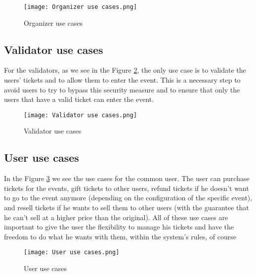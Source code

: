 \begin{figure}[H]
    \texttt{[image: Organizer use cases.png]}
    \centering
    \caption{Organizer use cases}
    \label{fig:organizer_use_cases}
\end{figure}

\subsection{Validator use cases}
\label{subsec:validator_use_cases}

For the validators, as we see in the Figure \ref{fig:validator_use_cases}, the only use case is to validate the users' tickets and to allow them to enter the event. This is a necessary step to avoid users to try to bypass this security measure and to ensure that only the users that have a valid ticket can enter the event.

\begin{figure}[H]
    \texttt{[image: Validator use cases.png]}
    \centering
    \caption{Validator use cases}
    \label{fig:validator_use_cases}
\end{figure}

\subsection{User use cases}
\label{subsec:user_use_cases}

In the Figure \ref{fig:user_use_cases} we see the use cases for the common user. The user can purchase tickets for the events, gift tickets to other users, refund tickets if he doesn't want to go to the event anymore (depending on the configuration of the specific event), and resell tickets if he wants to sell them to other users (with the guarantee that he can't sell at a higher price than the original). All of these use cases are important to give the user the flexibility to manage his tickets and have the freedom to do what he wants with them, within the system's rules, of course

\begin{figure}[H]
    \texttt{[image: User use cases.png]}
    \centering
    \caption{User use cases}
    \label{fig:user_use_cases}
\end{figure}
